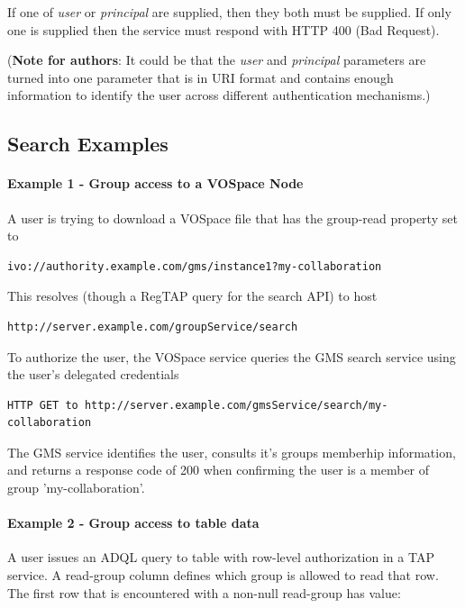 \documentclass[11pt,a4paper]{ivoa}
\begin{document}
If one of \emph{user} or \emph{principal} are supplied, then they both must be supplied.  If only one is supplied then the service must respond with HTTP 400 (Bad Request).

(\textbf{Note for authors}: It could be that the \emph{user} and \emph{principal} parameters are turned into one parameter that is in URI format and contains enough information to identify the user across different authentication mechanisms.)

\subsection {Search Examples}

\paragraph{Example 1 - Group access to a VOSpace Node}

A user is trying to download a VOSpace file that has the group-read property set to

\begin{verbatim}
ivo://authority.example.com/gms/instance1?my-collaboration
\end{verbatim}

This resolves (though a RegTAP query for the search API) to host

\begin{verbatim}
http://server.example.com/groupService/search
\end{verbatim}

To authorize the user, the VOSpace service queries the GMS search service using the user's delegated credentials

\begin{verbatim}
HTTP GET to http://server.example.com/gmsService/search/my-collaboration
\end{verbatim}

The GMS service identifies the user, consults it's groups memberhip information, and returns a response code of 200 when confirming the user is a member of group 'my-collaboration'.

\paragraph{Example 2 - Group access to table data}

A user issues an ADQL query to table with row-level authorization in a TAP service.  A read-group column defines which group is allowed to read that row.  The first row that is encountered with a non-null read-group has value:
\end{document}
